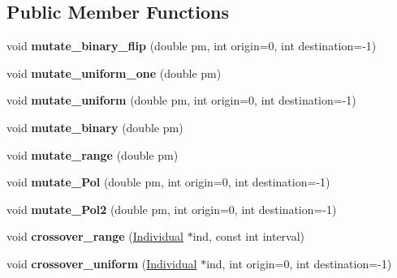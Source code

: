 \subsection*{Public Member Functions}
\begin{DoxyCompactItemize}
\item 
\mbox{\label{classIndividual_a6093773270d0dc49f4bd1d289e8b026e}} 
void {\bfseries mutate\+\_\+binary\+\_\+flip} (double pm, int origin=0, int destination=-\/1)
\item 
\mbox{\label{classIndividual_a0a08bd4e2c891329f7247f569300c910}} 
void {\bfseries mutate\+\_\+uniform\+\_\+one} (double pm)
\item 
\mbox{\label{classIndividual_aa813180f56458071173e34314124dd69}} 
void {\bfseries mutate\+\_\+uniform} (double pm, int origin=0, int destination=-\/1)
\item 
\mbox{\label{classIndividual_a74bd4e537f04468dd2a1fb76a8135d70}} 
void {\bfseries mutate\+\_\+binary} (double pm)
\item 
\mbox{\label{classIndividual_afa9b34ae673b8a7b355cff0e11e2cd3b}} 
void {\bfseries mutate\+\_\+range} (double pm)
\item 
\mbox{\label{classIndividual_a180da20e7bd49ce2e5950c7ee4e0a304}} 
void {\bfseries mutate\+\_\+\+Pol} (double pm, int origin=0, int destination=-\/1)
\item 
\mbox{\label{classIndividual_a51b40ce43c02e2087c6781f23bd0da3b}} 
void {\bfseries mutate\+\_\+\+Pol2} (double pm, int origin=0, int destination=-\/1)
\item 
\mbox{\label{classIndividual_a96b5da395328e11fd60f4fa0af07b2d7}} 
void {\bfseries crossover\+\_\+range} (\mbox{\hyperlink{classIndividual}{Individual}} $\ast$ind, const int interval)
\item 
\mbox{\label{classIndividual_a2c454d63a886a6245eee7b1d82284411}} 
void {\bfseries crossover\+\_\+uniform} (\mbox{\hyperlink{classIndividual}{Individual}} $\ast$ind, int origin=0, int destination=-\/1)

\end{DoxyCompactItemize}
